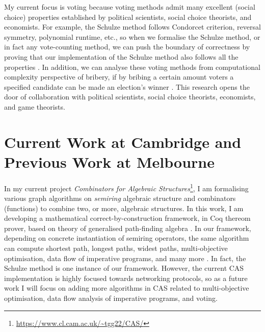 \documentclass[a4paper]{article}
\begin{document}
My current focus is voting because voting methods admit many excellent (social choice) properties
established by political scientists, social choice theorists, 
and economists. For example, the Schulze method follows Condorcet criterion, reversal symmetry,
polynomial runtime, etc., so when we formalise the Schulze method, or in fact any vote-counting method, 
we can push the boundary of correctness by proving that our 
implementation of the Schulze method also follows all the properties \cite{tiwari2021machine}. 
In addition, we can analyse these voting
methods from computational complexity perspective of bribery, if by bribing a certain amount 
voters a specified candidate can be made an election's winner \cite{faliszewski2006complexity}. 
This research opens the door of collaboration with political scientists, 
social choice theorists, economists, and game theorists.



\section{Current Work at Cambridge and Previous Work at Melbourne} 
In my current project \emph{Combinators for Algebraic Structures}\footnote{\url{https://www.cl.cam.ac.uk/~tgg22/CAS/}}, 
I am formalising various graph algorithms on \emph{semiring} algebraic 
structure and combinators (functions) to 
combine two, or more, algebraic structures. In this work, I am developing 
a mathematical correct-by-construction \cite{10.1007/978-3-319-66107-0_26} 
framework, in Coq thereom prover, based on theory of generalised 
path-finding algebra \cite{10.1093/imamat/15.2.161, 10.1145/1080091.1080094}. 
In our framework, depending on concrete instantiation 
of semiring operators, the same algorithm can compute shortest path, longest paths, 
widest paths, multi-objective optimisation, data flow of imperative programs, and many more \cite{gondran2008graphs}. 
In fact, the Schulze method is one instance of our framework. However, 
the current CAS implementation is highly focused towards networking protocols,
so as a future work I will focus on adding more algorithms in CAS related 
to multi-objective optimisation, data flow analysis of imperative programs, and voting. 
\end{document}
